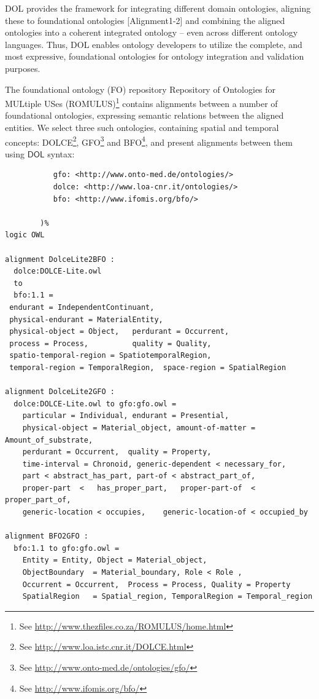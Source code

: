 \documentclass[10pt,fleqn,%
\ifpretendfinal
final%
\else
draft%
\fi,
]{scrreprt}
\newcommand*{\DOL}{\ensuremath{\mathsf{DOL}}\xspace}
\begin{document}
DOL  provides the framework for integrating different domain ontologies, aligning these to 
foundational ontologies [Alignment1-2] and combining the aligned ontologies into a coherent 
integrated ontology -- even across different ontology languages. Thus, DOL  enables ontology 
developers to utilize the complete, and most expressive, foundational ontologies for ontology 
integration and validation purposes. 

The foundational ontology (FO) repository Repository of Ontologies for MULtiple USes (ROMULUS)\footnote{See \url{http://www.thezfiles.co.za/ROMULUS/home.html}}
contains alignments between a number of foundational ontologies, expressing semantic relations between the aligned
entities. We select three such ontologies, containing spatial and temporal concepts: DOLCE\footnote{See \url{http://www.loa.istc.cnr.it/DOLCE.html}}, GFO\footnote{See \url{http://www.onto-med.de/ontologies/gfo/}} and BFO\footnote{See \url{http://www.ifomis.org/bfo/}}, and present alignments between them 
using \DOL syntax:

\begin{lstlisting}[basicstyle=\ttfamily\footnotesize,language=dolText,morekeywords={props,ObjectProperty,Class,DisjointUnionOf,SubClassOf,Characteristics,Transitive,Asymmetric,SubPropertyOf,DisjointClasses,EquivalentTo,inverse,only,forall,iff,if,or,exists,distributed,from},escapechar=@,mathescape]
%prefix(
           gfo: <http://www.onto-med.de/ontologies/>
           dolce: <http://www.loa-cnr.it/ontologies/>
           bfo: <http://www.ifomis.org/bfo/>
           
        )%
logic OWL

alignment DolceLite2BFO :
  dolce:DOLCE-Lite.owl
  to
  bfo:1.1 =
 endurant = IndependentContinuant,
 physical-endurant = MaterialEntity,
 physical-object = Object,   perdurant = Occurrent,
 process = Process,          quality = Quality,
 spatio-temporal-region = SpatiotemporalRegion,
 temporal-region = TemporalRegion,  space-region = SpatialRegion

alignment DolceLite2GFO :
  dolce:DOLCE-Lite.owl to gfo:gfo.owl =
 	particular = Individual, endurant = Presential,
 	physical-object = Material_object, amount-of-matter = Amount_of_substrate,
 	perdurant = Occurrent, 	quality = Property,
 	time-interval = Chronoid, generic-dependent < necessary_for,
 	part < abstract_has_part, part-of < abstract_part_of,
 	proper-part  <	 has_proper_part,  	proper-part-of  < proper_part_of,
 	generic-location < occupies, 	generic-location-of < occupied_by

alignment BFO2GFO :
  bfo:1.1 to gfo:gfo.owl =
	Entity = Entity, Object = Material_object,
	ObjectBoundary  = Material_boundary, Role < Role ,
 	Occurrent = Occurrent, 	Process = Process, Quality = Property
 	SpatialRegion 	= Spatial_region, TemporalRegion = Temporal_region 	
\end{lstlisting}
\end{document}
